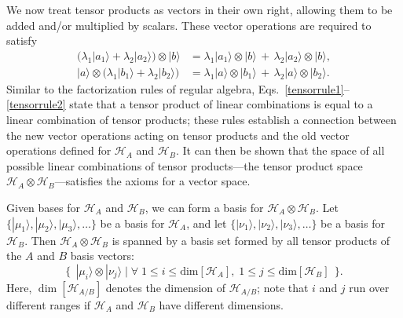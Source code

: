 \documentclass[pra,12pt]{revtex4}
\begin{document}
We now treat tensor products as vectors in their own right, allowing
them to be added and/or multiplied by scalars.  These vector
operations are required to satisfy
\begin{align}
  \Big(\lambda_1 |a_1\rangle
  + \lambda_2 |a_2\rangle\Big) \otimes |b\rangle &=
  \lambda_1 |a_1\rangle \otimes |b\rangle \,+\,
  \lambda_2 |a_2\rangle \otimes |b\rangle, \label{tensorrule1} \\
  |a\rangle \otimes \Big(\lambda_1 |b_1\rangle
  + \lambda_2 |b_2\rangle\Big) &=
  \lambda_1 |a\rangle \otimes |b_1\rangle \,+\,
  \lambda_2 |a\rangle \otimes |b_2\rangle.
  \label{tensorrule2} 
\end{align}
Similar to the factorization rules of regular algebra,
Eqs.~\eqref{tensorrule1}--\eqref{tensorrule2} state that a tensor
product of linear combinations is equal to a linear combination of
tensor products; these rules establish a connection between the new
vector operations acting on tensor products and the old vector
operations defined for $\mathscr{H}_A$ and $\mathscr{H}_B$.  It can
then be shown that the space of all possible linear combinations of
tensor products---the tensor product space $\mathscr{H}_A \otimes
\mathscr{H}_B$---satisfies the axioms for a vector space.

Given bases for $\mathscr{H}_A$ and $\mathscr{H}_B$, we can form a
basis for $\mathscr{H}_A\otimes \mathscr{H}_B$.  Let $\{|\mu_1\rangle,
|\mu_2\rangle, |\mu_3\rangle, \dots\}$ be a basis for $\mathscr{H}_A$,
and let $\{|\nu_1\rangle, |\nu_2\rangle, |\nu_3\rangle, \dots\}$ be a
basis for $\mathscr{H}_B$.  Then $\mathscr{H}_A \otimes \mathscr{H}_B$
is spanned by a basis set formed by all tensor products of the $A$ and
$B$ basis vectors:
\begin{equation}
  \Big\{\;\,|\mu_i\rangle\otimes|\nu_j\rangle \;\Big|\;
  \forall \; 1 \le i \le \mathrm{dim}[\mathscr{H}_A],
  \; 1 \le j\le \mathrm{dim}[\mathscr{H}_B] \;\,\Big\}.
  \label{tensorbasis}
\end{equation}
Here, $\dim[\mathscr{H}_{A/B}]$ denotes the dimension of
$\mathscr{H}_{A/B}$; note that $i$ and $j$ run over different ranges
if $\mathscr{H}_{A}$ and $\mathscr{H}_{B}$ have different dimensions.
\end{document}
